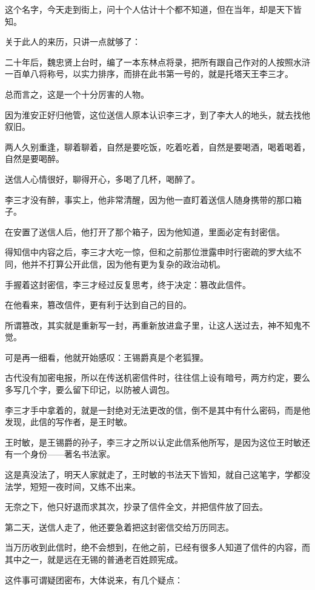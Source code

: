 \begin{multicols}{\theparacolNo}
		这个名字，今天走到街上，问十个人估计十个都不知道，但在当年，却是天下皆知。

		关于此人的来历，只讲一点就够了：

		二十年后，魏忠贤上台时，编了一本东林点将录，把所有跟自己作对的人按照水浒一百单八将称号，以实力排序，而排在此书第一号的，就是托塔天王李三才。

		总而言之，这是一个十分厉害的人物。

		因为淮安正好归他管，这位送信人原本认识李三才，到了李大人的地头，就去找他叙旧。

		两人久别重逢，聊着聊着，自然是要吃饭，吃着吃着，自然是要喝酒，喝着喝着，自然是要喝醉。

		送信人心情很好，聊得开心，多喝了几杯，喝醉了。

		李三才没有醉，事实上，他非常清醒，因为他一直盯着送信人随身携带的那口箱子。

		在安置了送信人后，他打开了那个箱子，因为他知道，里面必定有封密信。

		得知信中内容之后，李三才大吃一惊，但和之前那位泄露申时行密疏的罗大纮不同，他并不打算公开此信，因为他有更为复杂的政治动机。

		手握着这封密信，李三才经过反复思考，终于决定：篡改此信件。

		在他看来，篡改信件，更有利于达到自己的目的。

		所谓篡改，其实就是重新写一封，再重新放进盒子里，让这人送过去，神不知鬼不觉。

		可是再一细看，他就开始感叹：王锡爵真是个老狐狸。

		古代没有加密电报，所以在传送机密信件时，往往信上设有暗号，两方约定，要么多写几个字，要么留下印记，以防被人调包。

		李三才手中拿着的，就是一封绝对无法更改的信，倒不是其中有什么密码，而是他发现，此信的写作者，是王时敏。

		王时敏，是王锡爵的孙子，李三才之所以认定此信系他所写，是因为这位王时敏还有一个身份——著名书法家。

		这是真没法了，明天人家就走了，王时敏的书法天下皆知，就自己这笔字，学都没法学，短短一夜时间，又练不出来。

		无奈之下，他只好退而求其次，抄录了信件全文，并把信件放了回去。

		第二天，送信人走了，他还要急着把这封密信交给万历同志。

		当万历收到此信时，绝不会想到，在他之前，已经有很多人知道了信件的内容，而其中之一，就是远在无锡的普通老百姓顾宪成。

		这件事可谓疑团密布，大体说来，有几个疑点：


\end{multicols}
